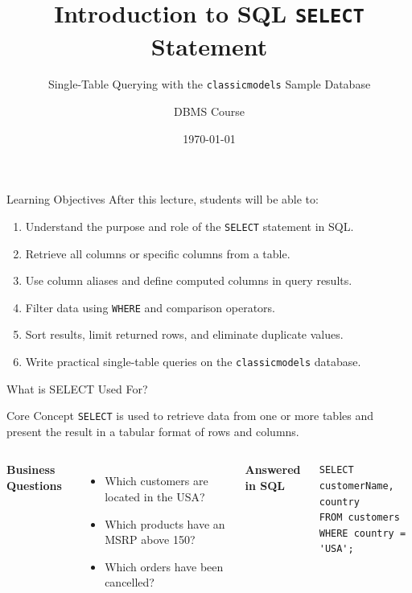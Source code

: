 \documentclass[aspectratio=169,11pt]{beamer}
\title[SQL SELECT]{Introduction to SQL \texttt{SELECT} Statement}
\subtitle{Single-Table Querying with the \texttt{classicmodels} Sample Database}
\author{DBMS Course}
\institute{Smart Logistics and Supply Chain Management Lab}
\date{\today}
\newcommand{\kw}[1]{\textcolor{sqlblue}{\texttt{#1}}}
\newcommand{\minihead}[1]{\vspace{2pt}\textbf{#1}\vspace{2pt}}
\begin{document}
\begin{frame}
  \titlepage
\end{frame}

\begin{frame}{Learning Objectives}
After this lecture, students will be able to:
\begin{enumerate}
  \item Understand the purpose and role of the \kw{SELECT} statement in SQL.
  \item Retrieve all columns or specific columns from a table.
  \item Use column aliases and define computed columns in query results.
  \item Filter data using \kw{WHERE} and comparison operators.
  \item Sort results, limit returned rows, and eliminate duplicate values.
  \item Write practical single-table queries on the \texttt{classicmodels} database.
\end{enumerate}
\end{frame}

\begin{frame}[fragile]{What is SELECT Used For?}
\begin{block}{Core Concept}
\kw{SELECT} is used to retrieve data from one or more tables and present the result in a tabular format of rows and columns.
\end{block}
\begin{columns}[T]
\minihead{Business Questions}
\begin{itemize}
  \item Which customers are located in the USA?
  \item Which products have an MSRP above 150?
  \item Which orders have been cancelled?
\end{itemize}
\minihead{Answered in SQL}
\begin{lstlisting}
SELECT customerName, country
FROM customers
WHERE country = 'USA';
\end{lstlisting}
\end{columns}
\end{frame}
\end{document}
